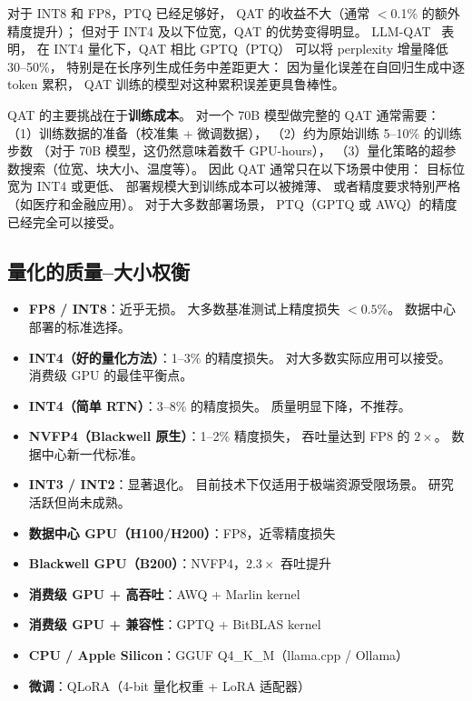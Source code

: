 对于 INT8 和 FP8，PTQ 已经足够好，
QAT 的收益不大（通常 $<$0.1\% 的额外精度提升）；
但对于 INT4 及以下位宽，QAT 的优势变得明显。
LLM-QAT~\cite{liu2024llmqat} 表明，
在 INT4 量化下，QAT 相比 GPTQ（PTQ）
可以将 perplexity 增量降低 30--50\%，
特别是在长序列生成任务中差距更大：
因为量化误差在自回归生成中逐 token 累积，
QAT 训练的模型对这种累积误差更具鲁棒性。

QAT 的主要挑战在于\textbf{训练成本}。
对一个 70B 模型做完整的 QAT 通常需要：
（1）训练数据的准备（校准集 + 微调数据），
（2）约为原始训练 5--10\% 的训练步数
（对于 70B 模型，这仍然意味着数千 GPU-hours），
（3）量化策略的超参数搜索（位宽、块大小、温度等）。
因此 QAT 通常只在以下场景中使用：
目标位宽为 INT4 或更低、
部署规模大到训练成本可以被摊薄、
或者精度要求特别严格（如医疗和金融应用）。
对于大多数部署场景，
PTQ（GPTQ 或 AWQ）的精度已经完全可以接受。

\subsection{量化的质量--大小权衡}

\begin{keybox}
\begin{itemize}[noitemsep]
  \item \textbf{FP8 / INT8}：近乎无损。
        大多数基准测试上精度损失 $<0.5\%$。
        数据中心部署的标准选择。
  \item \textbf{INT4（好的量化方法）}：1--3\% 的精度损失。
        对大多数实际应用可以接受。
        消费级 GPU 的最佳平衡点。
  \item \textbf{INT4（简单 RTN）}：3--8\% 的精度损失。
        质量明显下降，不推荐。
  \item \textbf{NVFP4（Blackwell 原生）}：1--2\% 精度损失，
        吞吐量达到 FP8 的 $2\times$。
        数据中心新一代标准。
  \item \textbf{INT3 / INT2}：显著退化。
        目前技术下仅适用于极端资源受限场景。
        研究活跃但尚未成熟。
\end{itemize}
\end{keybox}

\begin{keybox}[量化方法速查（2026 年初）]
\begin{itemize}[noitemsep]
  \item \textbf{数据中心 GPU（H100/H200）}：FP8，近零精度损失
  \item \textbf{Blackwell GPU（B200）}：NVFP4，$2.3\times$ 吞吐提升
  \item \textbf{消费级 GPU + 高吞吐}：AWQ + Marlin kernel
  \item \textbf{消费级 GPU + 兼容性}：GPTQ + BitBLAS kernel
  \item \textbf{CPU / Apple Silicon}：GGUF Q4\_K\_M（llama.cpp / Ollama）
  \item \textbf{微调}：QLoRA（4-bit 量化权重 + LoRA 适配器）
\end{itemize}
\end{keybox}


